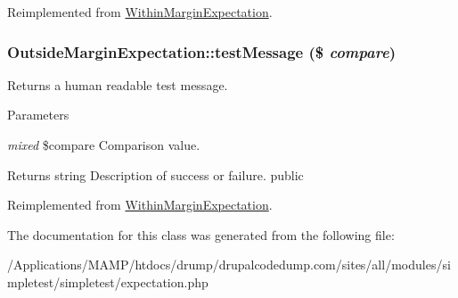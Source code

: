 Reimplemented from \hyperlink{class_within_margin_expectation_a3c8697495cb187b62bc6cf020e2e2ded}{WithinMarginExpectation}.\hypertarget{class_outside_margin_expectation_a62179c3675f6db8e4e41d7fffc32acfd}{
\subsubsection[{testMessage}]{\setlength{\rightskip}{0pt plus 5cm}OutsideMarginExpectation::testMessage (\$ {\em compare})}}
\label{class_outside_margin_expectation_a62179c3675f6db8e4e41d7fffc32acfd}
Returns a human readable test message. 
\begin{DoxyParams}{Parameters}
\item[{\em mixed}]\$compare Comparison value. \end{DoxyParams}
\begin{DoxyReturn}{Returns}
string Description of success or failure.  public 
\end{DoxyReturn}


Reimplemented from \hyperlink{class_within_margin_expectation_a4b2f6fda3d30a50c3b3ce003520262c8}{WithinMarginExpectation}.

The documentation for this class was generated from the following file:\begin{DoxyCompactItemize}
\item 
/Applications/MAMP/htdocs/drump/drupalcodedump.com/sites/all/modules/simpletest/simpletest/expectation.php\end{DoxyCompactItemize}
